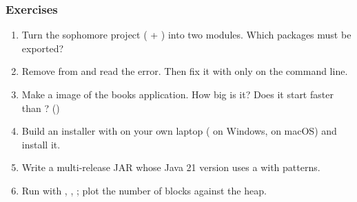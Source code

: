 \documentclass[aspectratio=169,10pt,compress]{beamer}
\begin{document}
\begin{frame}[t,fragile] \frametitle{Exercises}
  \begin{enumerate}\small
    \item Turn the sophomore project ( + ) into two modules. Which packages must be exported?
    \item Remove  from  and read the error. Then fix it with  only on the command line.
    \item Make a  image of the books application. How big is it? Does it start faster than ? ()
    \item Build an installer with  on your own laptop ( on Windows,  on macOS) and install it.
    \item Write a multi-release JAR whose Java 21 version uses a  with patterns.
    \item Run  with , , ; plot the number of blocks against the heap.
  \end{enumerate}
\end{frame}




\begin{frame}[t,fragile]
	\begin{center}
		\vspace{4cm}
	\end{center}
\end{frame}
\end{document}
